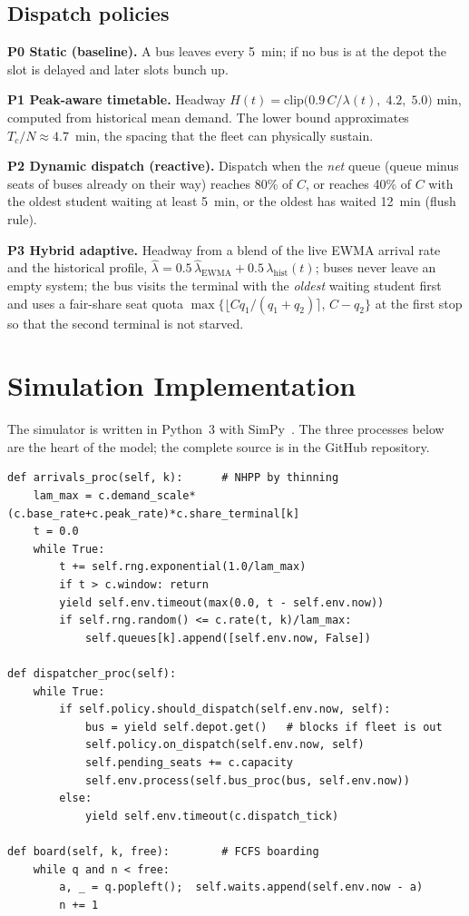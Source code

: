 \documentclass[conference]{IEEEtran}
\begin{document}
\subsection{Dispatch policies}
\textbf{P0 Static (baseline).} A bus leaves every 5~min; if no bus is at the depot the slot is delayed and later slots bunch up.\par
\textbf{P1 Peak-aware timetable.} Headway $H(t)=\mathrm{clip}\!\big(0.9\,C/\lambda(t),\;4.2,\;5.0\big)$ min, computed from historical mean demand. The lower bound approximates $T_c/N\approx 4.7$~min, the spacing that the fleet can physically sustain.\par
\textbf{P2 Dynamic dispatch (reactive).} Dispatch when the \emph{net} queue (queue minus seats of buses already on their way) reaches 80\% of $C$, or reaches 40\% of $C$ with the oldest student waiting at least 5~min, or the oldest has waited 12~min (flush rule).\par
\textbf{P3 Hybrid adaptive.} Headway from a blend of the live EWMA arrival rate and the historical profile, $\hat\lambda=0.5\,\hat\lambda_{\text{EWMA}}+0.5\,\lambda_{\text{hist}}(t)$; buses never leave an empty system; the bus visits the terminal with the \emph{oldest} waiting student first and uses a fair-share seat quota $\max\{\lfloor C q_1/(q_1+q_2)\rceil,\,C-q_2\}$ at the first stop so that the second terminal is not starved.

\section{Simulation Implementation}
The simulator is written in Python~3 with SimPy~\cite{simpy}. The three processes below are the heart of the model; the complete source is in the GitHub repository.

\begin{lstlisting}
def arrivals_proc(self, k):      # NHPP by thinning
    lam_max = c.demand_scale*(c.base_rate+c.peak_rate)*c.share_terminal[k]
    t = 0.0
    while True:
        t += self.rng.exponential(1.0/lam_max)
        if t > c.window: return
        yield self.env.timeout(max(0.0, t - self.env.now))
        if self.rng.random() <= c.rate(t, k)/lam_max:
            self.queues[k].append([self.env.now, False])

def dispatcher_proc(self):
    while True:
        if self.policy.should_dispatch(self.env.now, self):
            bus = yield self.depot.get()   # blocks if fleet is out
            self.policy.on_dispatch(self.env.now, self)
            self.pending_seats += c.capacity
            self.env.process(self.bus_proc(bus, self.env.now))
        else:
            yield self.env.timeout(c.dispatch_tick)

def board(self, k, free):        # FCFS boarding
    while q and n < free:
        a, _ = q.popleft();  self.waits.append(self.env.now - a)
        n += 1
\end{lstlisting}
\end{document}
